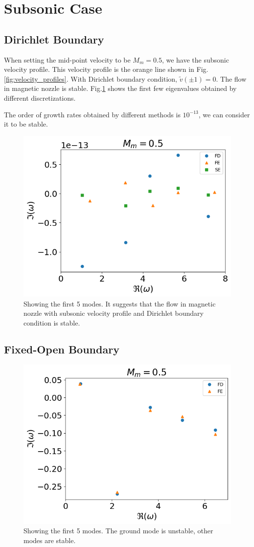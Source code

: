 \section{Subsonic Case}
\subsection{Dirichlet Boundary}
When setting the mid-point velocity to be $M_m=0.5$, we have the subsonic velocity profile. This velocity profile is the orange line shown in Fig.\ref{fig:velocity_profiles}. With Dirichlet boundary condition, $\tilde{v}(\pm 1) =0$. The flow in magnetic nozzle is stable. Fig.\ref{fig:subsonic_v_dirichlet} shows the first few eigenvalues obtained by different discretizations. 

The order of growth rates obtained by different methods is $10^{-13}$, we can consider it to be stable.
\begin{figure} [H]
	\centering
	\includegraphics[width=0.7\linewidth]{img/numerical_experiments/fixed_fixed/subsonic_v}
	\caption{Showing the first 5 modes. It suggests that the flow in magnetic nozzle with subsonic velocity profile and Dirichlet boundary condition is stable.}
	\label{fig:subsonic_v_dirichlet}
\end{figure}

\subsection{Fixed-Open Boundary}
\begin{figure} [H]
	\centering
	\includegraphics[width=0.7\linewidth]{img/numerical_experiments/fixed_open/subsonic_v}
	\caption{Showing the first 5 modes. The ground mode is unstable, other modes are stable.}
	\label{fig:subsonic_v_fixed_open}
\end{figure}


